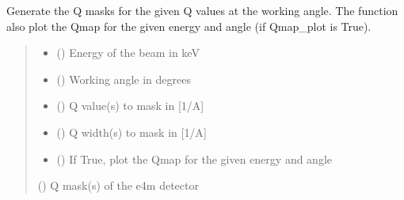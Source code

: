 \documentclass[letterpaper,10pt,english]{sphinxmanual}
\begin{document}
\begin{fulllineitems}
\label{\detokenize{index:XPCS_tools.gen_Qmask}}
\pysigstartsignatures
\pysiglinewithargsret
{}
{\sphinxparamcomma {}\sphinxparamcomma {}\sphinxparamcomma {}\sphinxparamcomma {}}
{}
\pysigstopsignatures
\sphinxAtStartPar
Generate the Q masks for the given Q values at the working angle. The function also plot the Qmap for the given energy and angle (if Qmap\_plot is True).
\begin{quote}\begin{description}
\begin{itemize}
\item {} 
\sphinxAtStartPar
{} () \textendash{} Energy of the beam in keV

\item {} 
\sphinxAtStartPar
{} () \textendash{} Working angle in degrees

\item {} 
\sphinxAtStartPar
{} () \textendash{} Q value(s) to mask in {[}1/A{]}

\item {} 
\sphinxAtStartPar
{} () \textendash{} Q width(s) to mask in {[}1/A{]}

\item {} 
\sphinxAtStartPar
{} () \textendash{} If True, plot the Qmap for the given energy and angle

\end{itemize}

\sphinxAtStartPar
{} () \textendash{} Q mask(s) of the e4m detector

\end{description}\end{quote}

\end{fulllineitems}

\end{document}
